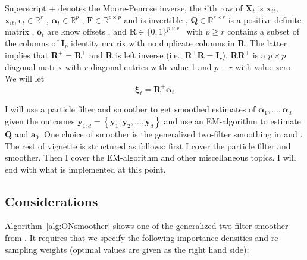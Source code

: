 \documentclass[9pt, notitlepage]{article}
\renewcommand{\vec}[1]{\bm{#1}}
\newcommand{\mat}[1]{\mathbf{#1}}
\newcommand{\Lbrace}[1]{\left\{ #1\right\}}
\newcommand{\dimState}{p}
\newcommand{\dimRng}{r}
\newcommand{\nPeriods}{d}
\begin{document}
Superscript $+$ denotes the Moore-Penrose inverse, %
the $i$'th row of $\mat{X}_t$ is $\vec{x}_{it}$, $\vec{x}_{it},\vec{\epsilon}_t\in\mathbb{R}^\dimRng$%
, $\vec{\alpha}_t\vec\in\mathbb{R}^\dimState$%
, $\mat{F} \in \mathbb{R}^{\dimState\times\dimState}$ and is invertible%
, $\mat{Q} \in \mathbb{R}^{\dimRng\times\dimRng}$ is a positive definite matrix%
, $\vec{o}_t$ are know offsets%
, and $\mat{R} \in \{0,1\}^{\dimState\times \dimRng}$%
~with $\dimState\geq\dimRng$ contains a subset of the columns of $\mat{I}_{\dimState}$ identity matrix with no duplicate columns in $\mat{R}$. The latter implies that $\mat{R}^+ = \mat{R}^\top$ and $\mat{R}$ is left inverse (i.e., $\mat{R}^\top\mat{R} = \mat{I}_\dimRng$). $\mat{R}\mat{R}^\top$ is a $\dimState\times\dimState$ diagonal matrix with $\dimRng$ diagonal entries with value 1 and $\dimState - \dimRng$ with value zero. We will let %
%
$$\vec{\xi}_{t} = \mat{R}^{+}\vec{\alpha}_t$$

I will use a particle filter and smoother to get smoothed estimates of $\vec{\alpha}_1, \dots, \vec{\alpha}_\nPeriods$ given the outcomes $\vec{y}_{1:\nPeriods} = \Lbrace{\vec{y}_1,\vec{y}_2,\dots, \vec{y}_\nPeriods}$ and use an EM-algorithm to estimate $\mat{Q}$ and $\vec{a}_0$. One choice of smoother is the generalized two-filter smoothing in \cite{fearnhead10} and \cite{briers10}. The rest of vignette is structured as follows: first I cover the particle filter and smoother. Then I cover the EM-algorithm and other miscellaneous topics. I will end with what is implemented at this point.

\subsection*{Considerations}
Algorithm~\ref{alg:ONsmoother} shows one of the generalized two-filter smoother from \cite{fearnhead10}. It requires that we specify the following importance densities and re-sampling weights (optimal values are given as the right hand side):
\end{document}
